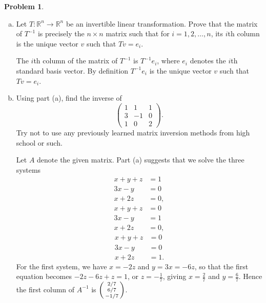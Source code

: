 \documentclass[11pt,oneside]{amsart}
\theoremstyle{definition}
\newtheorem{problem}{Problem}
\newcommand{\bR}{\mathbb{R}}
\newcommand*\colvec[1]{\begin{psmallmatrix}#1\end{psmallmatrix}}
\begin{document}
    \begin{problem}
        \leavevmode\begin{enumerate}[(a)]
            \item Let $T\colon\bR^n\to\bR^n$ be an invertible linear transformation. Prove that the matrix of $T^{-1}$ is precisely the $n\times n$ matrix such that for $i=1,2,\dots,n$, its $i$th column is the unique vector $v$ such that $Tv=e_i$.
            \begin{solution}
                The $i$th column of the matrix of $T^{-1}$ is $T^{-1}e_i$, where $e_i$ denotes the $i$th standard basis vector. By definition $T^{-1}e_i$ is the unique vector $v$ such that $Tv=e_i$.
            \end{solution}
            
            \item Using part (a), find the inverse of
            \[\begin{pmatrix}1&1&1\\3&-1&0\\1&0&2\end{pmatrix}.\]
            Try not to use any previously learned matrix inversion methods from high school or such.
            \begin{solution}
                Let $A$ denote the given matrix. Part (a) suggests that we solve the three systems
                \begin{align*}
                    x+y+z &= 1\\
                    3x-y &= 0\\
                    x+2z &= 0,
                \end{align*}
                \begin{align*}
                    x+y+z &= 0\\
                    3x-y &= 1\\
                    x+2z &= 0,
                \end{align*}
                \begin{align*}
                    x+y+z &= 0\\
                    3x-y &= 0\\
                    x+2z &= 1.
                \end{align*}
                For the first system, we have $x=-2z$ and $y=3x=-6z$, so that the first equation becomes $-2z-6z+z=1$, or $z=-\frac 17$, giving $x=\frac27$ and $y=\frac67$. Hence the first column of $A^{-1}$ is $\colvec{2/7\\6/7\\-1/7}$.


\end{solution}
\end{enumerate}
\end{problem}
\end{document}
